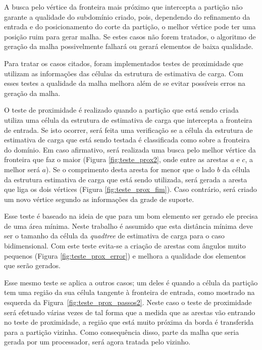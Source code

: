A busca pelo vértice da fronteira mais próximo que intercepta a partição não garante a qualidade do subdomínio criado, pois, dependendo do refinamento da entrada e do posicionamento do corte da partição, o melhor vértice pode ter uma posição ruim para gerar malha. Se estes casos não forem tratados, o algoritmo de geração da malha possivelmente falhará ou gerará elementos de baixa qualidade.

Para tratar os casos citados, foram implementados testes de proximidade que utilizam as informações das células da estrutura de estimativa de carga. Com esses testes a qualidade da malha melhora além de se evitar possíveis erros na geração da malha.

O teste de proximidade é realizado quando a partição que está sendo criada utiliza uma célula da estrutura de estimativa de carga que intercepta a fronteira de entrada. Se isto ocorrer, será feita uma verificação se a célula da estrutura de estimativa de carga que está sendo testada é classificada como sobre a fronteira do domínio. Em caso afirmativo, será realizada uma busca pelo melhor vértice da fronteira que faz o maior  (Figura \ref{fig:teste_prox2}, onde entre as arestas $a$ e $c$, a melhor será $a$). Se o comprimento desta aresta for menor que o lado $b$ da célula da estrutura estimativa de carga que está sendo utilizada, será gerada a aresta que liga os dois vértices (Figura \ref{fig:teste_prox_fim}). Caso contrário, será criado um novo vértice segundo as informações da grade de suporte.

Esse teste é baseado na ideia de que para um bom elemento ser gerado ele precisa de uma área mínima. Neste trabalho é assumido que esta distância mínima deve ser o tamanho da célula da \textit{quadtree} de estimativa de carga para o caso bidimensional. Com este teste evita-se a criação de arestas com ângulos muito pequenos (Figura \ref{fig:teste_prox_error}) e melhora a qualidade dos elementos que serão gerados.

Esse mesmo teste se aplica a outros casos; um deles é quando a célula da partição tem uma região da sua célula tangente à fronteira de entrada, como mostrado na esquerda da Figura~\ref{fig:teste_prox_passos2}. Neste caso o teste de proximidade será efetuado várias vezes de tal forma que a medida que as arestas vão entrando no teste de proximidade, a região que está muito próxima da borda é transferida para a partição vizinha. Como consequência disso, parte da malha que seria gerada por um processador, será agora tratada pelo vizinho.


